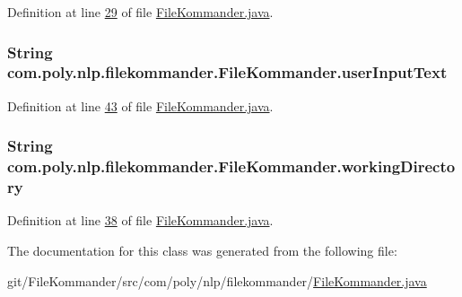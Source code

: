 Definition at line \hyperlink{L29}{29} of file \hyperlink{}{File\-Kommander.\-java}.

\hypertarget{classcom_1_1poly_1_1nlp_1_1filekommander_1_1_file_kommander_a499151b0f39dbce7b82a811c8cf21402}{
\subsubsection[{user\-Input\-Text}]{\setlength{\rightskip}{0pt plus 5cm}String com.\-poly.\-nlp.\-filekommander.\-File\-Kommander.\-user\-Input\-Text\hspace{0.3cm}{\ttfamily [private]}}}\label{classcom_1_1poly_1_1nlp_1_1filekommander_1_1_file_kommander_a499151b0f39dbce7b82a811c8cf21402}


Definition at line \hyperlink{L43}{43} of file \hyperlink{}{File\-Kommander.\-java}.

\hypertarget{classcom_1_1poly_1_1nlp_1_1filekommander_1_1_file_kommander_a862ebb1796e89d0d83d348797e7c6472}{
\subsubsection[{working\-Directory}]{\setlength{\rightskip}{0pt plus 5cm}String com.\-poly.\-nlp.\-filekommander.\-File\-Kommander.\-working\-Directory\hspace{0.3cm}{\ttfamily [private]}}}\label{classcom_1_1poly_1_1nlp_1_1filekommander_1_1_file_kommander_a862ebb1796e89d0d83d348797e7c6472}


Definition at line \hyperlink{L38}{38} of file \hyperlink{}{File\-Kommander.\-java}.



The documentation for this class was generated from the following file\-:\begin{DoxyCompactItemize}
\item 
git/\-File\-Kommander/src/com/poly/nlp/filekommander/\hyperlink{_file_kommander_8java}{File\-Kommander.\-java}\end{DoxyCompactItemize}
